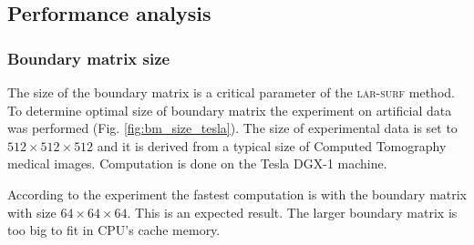 \subsection{Performance analysis}\label{sec:analysis}

\subsubsection*{Boundary matrix size}
The size of the boundary matrix is a critical parameter of the \textsc{lar-surf} method. To determine optimal size of boundary matrix the experiment on artificial data was performed (Fig.  \ref{fig:bm_size_tesla}). The size of experimental data is set to $512\times512\times512$ and it is derived from a typical size of Computed Tomography medical images. Computation is done on the Tesla DGX-1 machine.

According to the experiment the fastest computation is with the boundary matrix with size $64\times64\times64$. This is an expected result. The larger boundary matrix is too big to fit in CPU's cache memory.


